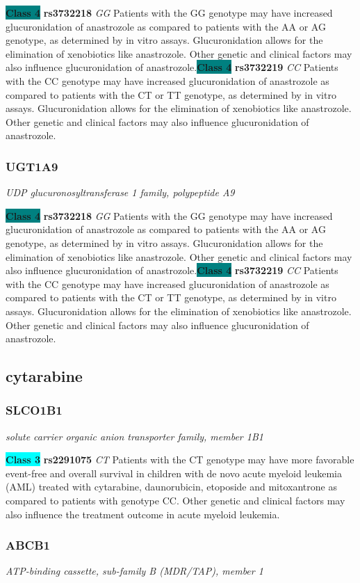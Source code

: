 \documentclass{report}
\begin{document}
\textbf{\colorbox{teal} {Class 4}} \textbf{ rs3732218 } \textit{ GG }
Patients with the GG genotype may have increased glucuronidation of anastrozole as compared to patients with the AA or AG genotype, as determined by in vitro assays. Glucuronidation allows for the elimination of xenobiotics like anastrozole. Other genetic and clinical factors may also influence glucuronidation of anastrozole.\newline\textbf{\colorbox{teal} {Class 4}} \textbf{ rs3732219 } \textit{ CC }
Patients with the CC genotype may have increased glucuronidation of anastrozole as compared to patients with the CT or TT genotype, as determined by in vitro assays. Glucuronidation allows for the elimination of xenobiotics like anastrozole. Other genetic and clinical factors may also influence glucuronidation of anastrozole. \newline\subsubsection{ UGT1A9 }
\textit{ UDP glucuronosyltransferase 1 family, polypeptide A9 }

\textbf{\colorbox{teal} {Class 4}} \textbf{ rs3732218 } \textit{ GG }
Patients with the GG genotype may have increased glucuronidation of anastrozole as compared to patients with the AA or AG genotype, as determined by in vitro assays. Glucuronidation allows for the elimination of xenobiotics like anastrozole. Other genetic and clinical factors may also influence glucuronidation of anastrozole.\newline\textbf{\colorbox{teal} {Class 4}} \textbf{ rs3732219 } \textit{ CC }
Patients with the CC genotype may have increased glucuronidation of anastrozole as compared to patients with the CT or TT genotype, as determined by in vitro assays. Glucuronidation allows for the elimination of xenobiotics like anastrozole. Other genetic and clinical factors may also influence glucuronidation of anastrozole. \newline\subsection{ cytarabine }\subsubsection{ SLCO1B1 }
\textit{ solute carrier organic anion transporter family, member 1B1 }

\textbf{\colorbox{cyan} {Class 3}} \textbf{ rs2291075 } \textit{ CT }
Patients with the CT genotype may have more favorable event-free and overall survival in children with de novo acute myeloid leukemia (AML) treated with cytarabine, daunorubicin, etoposide and mitoxantrone as compared to patients with genotype CC. Other genetic and clinical factors may also influence the treatment outcome in acute myeloid leukemia.\newline\subsubsection{ ABCB1 }
\textit{ ATP-binding cassette, sub-family B (MDR/TAP), member 1 }
\end{document}
